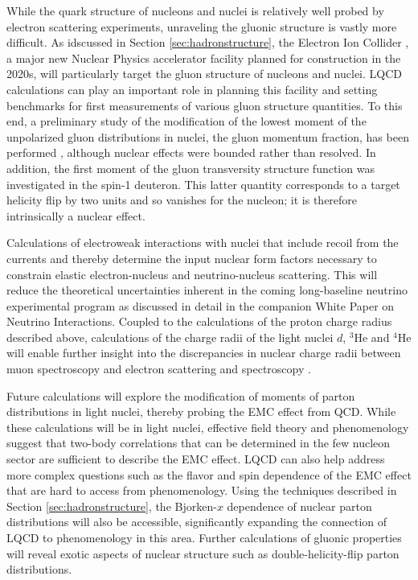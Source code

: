 While the quark structure of nucleons and nuclei is relatively well probed by electron scattering experiments, unraveling the gluonic structure is vastly more difficult. As idscussed in Section \ref{sec:hadronstructure}, the Electron Ion Collider \cite{Accardi:2012qut}, a major new Nuclear Physics accelerator facility planned for construction in the 2020s, will particularly target the gluon structure of nucleons and nuclei. LQCD calculations can play an important role in planning this facility and setting benchmarks for first measurements of various gluon structure quantities. To this end, a preliminary study of the modification of the lowest moment of the unpolarized  gluon distributions in nuclei, the gluon momentum fraction, has been performed \cite{Winter:2017bfs}, although nuclear effects were bounded rather than resolved.   In addition, the first moment of the gluon transversity structure function was investigated in the spin-1 deuteron. This latter  quantity  corresponds to a target helicity flip by two units and so vanishes for the nucleon; it is therefore intrinsically a nuclear effect.



Calculations of electroweak interactions with nuclei that include recoil from the currents and thereby determine the input nuclear form factors necessary to constrain  elastic electron-nucleus and  neutrino-nucleus scattering. This will reduce the theoretical uncertainties inherent in the coming long-baseline neutrino experimental program as discussed in detail in the companion White Paper on Neutrino Interactions. Coupled to the calculations of the proton charge radius described above, calculations of the charge radii of the light nuclei $d$, $^3$He and $^4$He  will enable further insight into the discrepancies in nuclear charge radii between muon spectroscopy and electron scattering and spectroscopy \cite{}.


Future calculations will explore the modification of moments of parton distributions in light nuclei, thereby probing the EMC effect from QCD. While these calculations will be in light nuclei, effective field theory \cite{Chen:2004zx,Chen:2016bde} and phenomenology \cite{Hen:2016kwk} suggest that two-body correlations that can be determined in the few nucleon sector are sufficient to describe the EMC effect. LQCD can also help address more complex questions such as the flavor and spin dependence of the EMC effect that are hard to access from phenomenology. Using the techniques described in Section \ref{sec:hadronstructure}, the Bjorken-$x$ dependence of nuclear parton distributions will also be accessible, significantly expanding the connection of LQCD to phenomenology in this area. Further calculations of gluonic properties will reveal exotic aspects of nuclear structure such as double-helicity-flip parton distributions.





